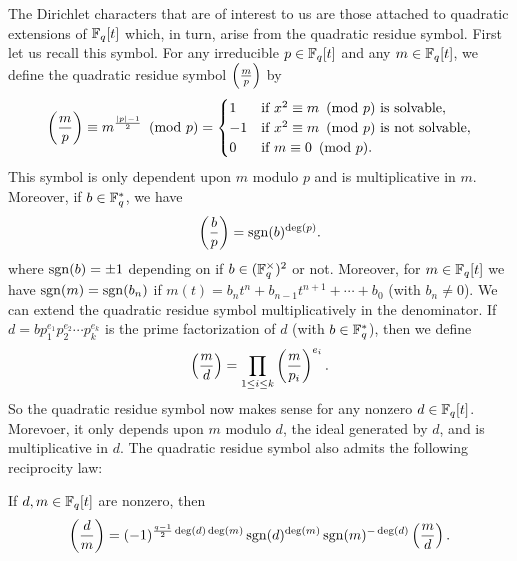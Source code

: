\documentclass[12pt,reqno,oneside]{amsart}
\begin{document}
    The Dirichlet characters that are of interest to us are those attached to quadratic extensions of $\mathbb{F}_{q}[t]$ which, in turn, arise from the quadratic residue symbol. First let us recall this symbol. For any irreducible $p \in \mathbb{F}_{q}[t]$ and any $m \in \mathbb{F}_{q}[t]$, we define the quadratic residue symbol $\textstyle{\left(\frac{m}{p}\right)}$ by
    \[
        \left(\frac{m}{p}\right) \equiv m^{\frac{|p|-1}{2}} \ \left(\text{mod }p\right) = \begin{cases} 1 & \text{if $x^{2} \equiv m \ \left(\text{mod }p\right)$ is solvable}, \\ -1 & \text{if $x^{2} \equiv m \ \left(\text{mod }p\right)$ is not solvable}, \\ 0 & \text{if $m \equiv 0 \ \left(\text{mod }p\right)$}. \end{cases}
    \]
    This symbol is only dependent upon $m$ modulo $p$ and is multiplicative in $m$. Moreover, if $b \in \mathbb{F}_{q}^{\ast}$, we have
    \[
        \left(\frac{b}{p}\right) = \operatorname{\mathrm{sgn}}(b)^{\deg(p)}.
    \]
    where $\operatorname{\mathrm{sgn}}(b) = \pm1$ depending on if $b \in (\mathbb{F}_{q}^{\times})^{2}$ or not. Moreover, for $m \in \mathbb{F}_{q}[t]$ we have $\operatorname{\mathrm{sgn}}(m) = \operatorname{\mathrm{sgn}}(b_{n})$ if $m(t) = b_{n}t^{n}+b_{n-1}t^{n+1}+\cdots+b_{0}$ (with $b_{n} \neq 0$). We can extend the quadratic residue symbol multiplicatively in the denominator. If $d = bp_{1}^{e_{1}}p_{2}^{e_{2}} \cdots p_{k}^{e_{k}}$ is the prime factorization of $d$ (with $b \in \mathbb{F}_{q}^{\ast}$), then we define
    \[
        \left(\frac{m}{d}\right) = \prod_{1 \le i \le k}\left(\frac{m}{p_{i}}\right)^{e_{i}}.
    \]
    So the quadratic residue symbol now makes sense for any nonzero $d \in \mathbb{F}_{q}[t]$. Morevoer, it only depends upon $m$ modulo $d$, the ideal generated by $d$, and is multiplicative in $d$. The quadratic residue symbol also admits the following reciprocity law:

    \begin{theorem}
        If $d,m \in \mathbb{F}_{q}[t]$ are nonzero, then
        \[
            \left(\frac{d}{m}\right) = (-1)^{\frac{q-1}{2}\deg(d)\deg(m)}\operatorname{\mathrm{sgn}}(d)^{\deg(m)}\operatorname{\mathrm{sgn}}(m)^{-\deg(d)}\left(\frac{m}{d}\right).
        \]
    \end{theorem}
\end{document}
